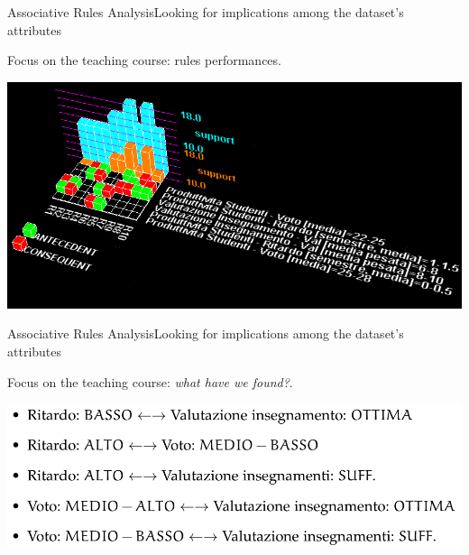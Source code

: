\begin{frame}{Associative Rules Analysis}{Looking for implications among the dataset's attributes}

    Focus on the \alert{teaching course}: rules performances.

    \begin{centering}
        \hspace{0.5cm}\includegraphics[scale=0.36]{../ass/apriori_min_1.png}
    \end{centering}

\end{frame}

\begin{frame}{Associative Rules Analysis}{Looking for implications among the dataset's attributes}

    Focus on the \alert{teaching course}: \emph{what have we found?}.

    \vspace{0.5cm}
    \begin{centering}
        \hspace{0.5cm}\includegraphics[scale=0.30]{ass1.png}
    \end{centering}

\end{frame}

